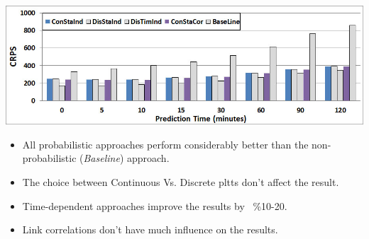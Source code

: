 \documentclass[t]{beamer}
\begin{document}
\begin{frame}
{\begin{center}
	\includegraphics[scale=0.3]{Approaches_All5.jpg}
\end{center}
}
\begin{itemize}
\item<2-> All probabilistic approaches perform considerably better than the non-probabilistic (\textit{Baseline}) approach.
\item<3-> The choice between Continuous Vs. Discrete pltts don't affect the result.
\item<4-> Time-dependent approaches improve the results by ~\%10-20.
\item<5-> Link correlations don't have much influence on the results.
\end{itemize}
\end{frame}
\end{document}
